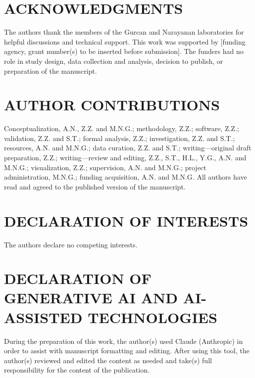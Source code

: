 \documentclass[12pt,letterpaper]{article}
\begin{document}
\section*{ACKNOWLEDGMENTS}

The authors thank the members of the Gurcan and Narayanan laboratories for helpful discussions and technical support.
This work was supported by [funding agency, grant number(s) to be inserted before submission]. The funders had no role in study design, data collection and analysis, decision to publish, or preparation of the manuscript.

\section*{AUTHOR CONTRIBUTIONS}

Conceptualization, A.N., Z.Z. and M.N.G.; methodology, Z.Z.; software, Z.Z.; validation, Z.Z. and S.T.; formal analysis, Z.Z.; investigation, Z.Z. and S.T.; resources, A.N. and M.N.G.; data curation, Z.Z. and S.T.; writing---original draft preparation, Z.Z.; writing---review and editing, Z.Z., S.T., H.L., Y.G., A.N. and M.N.G.; visualization, Z.Z.; supervision, A.N. and M.N.G.; project administration, M.N.G.; funding acquisition, A.N. and M.N.G. All authors have read and agreed to the published version of the manuscript.

\section*{DECLARATION OF INTERESTS}

The authors declare no competing interests.

\section*{DECLARATION OF GENERATIVE AI AND AI-ASSISTED TECHNOLOGIES}

During the preparation of this work, the author(s) used Claude (Anthropic) in order to assist with manuscript formatting and editing. After using this tool, the author(s) reviewed and edited the content as needed and take(s) full responsibility for the content of the publication.
\end{document}
